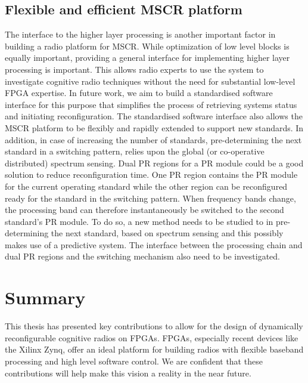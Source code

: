 \subsection{Flexible and efficient MSCR platform}
The interface to the higher layer processing is another important factor in building a radio platform for MSCR.
While optimization of low level blocks is equally important, providing a general interface for implementing higher layer processing is important.
This allows radio experts to use the system to investigate cognitive radio techniques without the need for substantial low-level FPGA expertise.
In future work, we aim to build a standardised software interface for this purpose that simplifies the process of retrieving systems status and initiating reconfiguration.
The standardised software interface also allows the MSCR platform to be flexibly and rapidly extended to support new standards.
In addition, in case of increasing the number of standards, pre-determining the next standard in a switching pattern, relies upon the global (or co-operative distributed) spectrum sensing.
Dual PR regions for a PR module could be a good solution to reduce reconfiguration time.
One PR region contains the PR module for the current operating standard while the other region can be reconfigured ready for the standard in the switching pattern.
When frequency bands change, the processing band can therefore instantaneously be switched to the second standard's PR module.
To do so, a new method needs to be studied to in pre-determining the next standard, based on spectrum sensing and this possibly makes use of a predictive system.
The interface between the processing chain and dual PR regions and the switching mechanism also need to be investigated.

\section{Summary}

This thesis has presented key contributions to allow for the design of dynamically reconfigurable cognitive radios on FPGAs. FPGAs, especially recent devices like the Xilinx Zynq, offer an ideal platform for building radios with flexible baseband processing and high level software control. We are confident that these contributions will help make this vision a reality in the near future.
